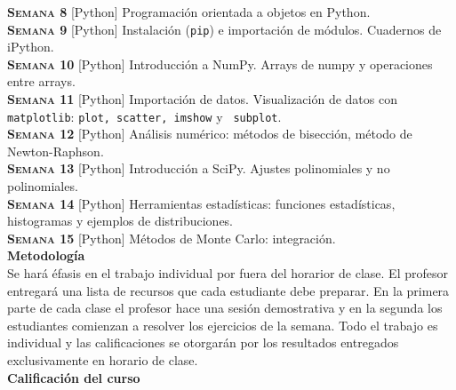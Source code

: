 \documentclass[letterpaper,10pt,onecolumn]{article}
\begin{document}
\noindent\textbf{\textsc{Semana 8}} [Python] Programaci\'on orientada
a objetos en Python.\\[-0.3cm]  

\noindent\textbf{\textsc{Semana 9}} [Python] Instalación (\verb+pip+) e
importación de módulos. Cuadernos de iPython.\\[-0.3cm]  

\noindent\textbf{\textsc{Semana 10}} [Python] Introducción a
NumPy. Arrays de numpy y operaciones entre arrays. \\[-0.3cm]  

\noindent\textbf{\textsc{Semana 11}} [Python] Importación de datos. Visualización de datos con
\verb+matplotlib+: \verb+plot, scatter, imshow+ y  \verb+ subplot+.\\[-0.3cm]  

\noindent\textbf{\textsc{Semana 12}} [Python] Análisis numérico:
métodos de bisección, método de Newton-Raphson. \\[-0.3cm]  

\noindent\textbf{\textsc{Semana 13}} [Python] Introducción a
SciPy. Ajustes polinomiales y no polinomiales.\\[-0.3cm]  

\noindent\textbf{\textsc{Semana 14}} [Python] Herramientas
estadísticas: funciones estadísticas, histogramas y ejemplos de
distribuciones.\\[-0.3cm] 

\noindent\textbf{\textsc{Semana 15}} [Python] Métodos de Monte Carlo:
integración.\\[0.1cm] 

\noindent\textbf{\large {} \quad Metodología}\\[-0.2cm]

\noindent\normalsize Se har\'a \'efasis en el trabajo individual por
fuera del horarior de clase. El profesor entregar\'a una lista de
recursos que cada estudiante debe preparar. 
En la primera parte de cada clase el profesor
hace una sesi\'on demostrativa y en la segunda los
estudiantes comienzan a resolver los ejercicios de la semana. 
Todo el trabajo es individual y las calificaciones se otorgar\'an por
los resultados entregados exclusivamente en horario de clase.
\\[0.1cm] 



\noindent\textbf{\large {} \quad Calificaci\'on del curso}\\[-0.2cm]
\end{document}
